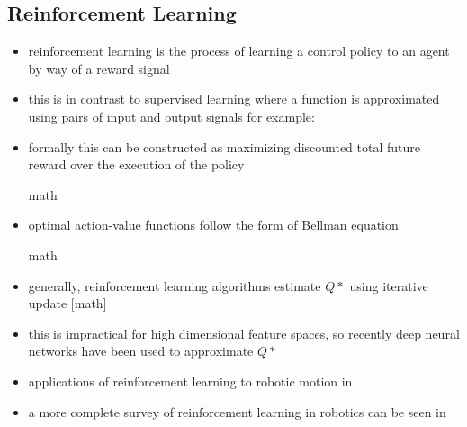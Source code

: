 \documentclass[paper=a4, fontsize=11pt]{scrartcl} %
\begin{document}
	\subsection{Reinforcement Learning}
	\begin{itemize}
		\item reinforcement learning is the process of learning a control policy to an agent by way of a reward signal
		\item this is in contrast to supervised learning where a function is approximated using pairs of input and output signals for example: \cite{Ross2013}
		\item formally this can be constructed as maximizing discounted total future reward over the execution of the policy
		\item [math]
		\item optimal action-value functions follow the form of Bellman equation
		\item [math]
		\item generally, reinforcement learning algorithms estimate $Q*$ using iterative update [math] \cite{Sutton:1998:IRL:551283}
		\item this is impractical for high dimensional feature spaces, so recently deep neural networks have been used to approximate $Q*$ \cite{Mnih2013}
		\item applications of reinforcement learning to robotic motion in \cite{DBLP:conf/icra/KohlS04} \cite{DBLP:conf/iros/TedrakeZS04} \cite{geng2005fast} \cite{bagnell2001autonomous} \cite{riedmiller2009reinforcement}
		\item a more complete survey of reinforcement learning in robotics can be seen in \cite{kober2013reinforcement}
	\end{itemize}
\end{document}
